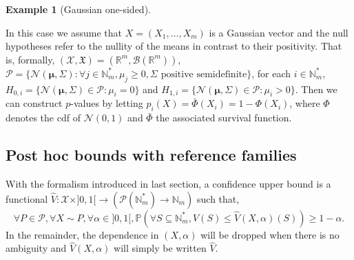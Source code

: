 \documentclass[
  11pt,
  a4paper,
]{article}
\theoremstyle{plain}
\theoremstyle{plain}
\theoremstyle{plain}
\theoremstyle{definition}
\theoremstyle{definition}
\newtheorem{example}{Example}[section]
\theoremstyle{remark}
\begin{document}
\begin{example}[Gaussian
one-sided]\protect\hypertarget{exm-gauss}{}\label{exm-gauss}

In this case we assume that \(X=(X_1,\dotsc,X_m)\) is a Gaussian vector
and the null hypotheses refer to the nullity of the means in contrast to
their positivity. That is, formally,
\((\mathcal{X},\mathfrak{X})=(\mathbb R^m, \mathcal B\left(\mathbb R^m  \right))\),
\(\mathcal P=\{ \mathcal N(\boldsymbol{\mu}, \Sigma) : \forall j \in\mathbb{N}_m^*, \mu_j\geq 0, \Sigma \text{ positive semidefinite}  \}\),
for each \(i\in\mathbb{N}_m^*\),
\(H_{0,i}= \{ \mathcal N(\boldsymbol{\mu}, \Sigma) \in \mathcal P :\mu_i=0 \}\)
and
\(H_{1,i}=\{ \mathcal N(\boldsymbol{\mu}, \Sigma) \in \mathcal P :\mu_i>0 \}\).
Then we can construct \(p\)-values by letting
\(p_i(X)=\bar\Phi(X_i)=1-\Phi(X_i)\), where \(\Phi\) denotes the cdf of
\(\mathcal N(0,1)\) and \(\bar\Phi\) the associated survival function.

\end{example}

\subsection{Post hoc bounds with reference
families}\label{sec-reference-fam}

With the formalism introduced in last section, a confidence upper bound
is a functional
\(\widehat V:\mathcal X\times ]0,1[\to(\mathcal P(\mathbb{N}_m^*) \to \mathbb{N}_m)\)
such that, \begin{equation}
\forall P\in\mathcal P, \forall X\sim P, \forall \alpha \in ]0,1[, \mathbb{P}\left(\forall S \subseteq \mathbb{N}_m^*, V(S)\leq \widehat V(X,\alpha)(S)\right)\geq 1-\alpha.
\label{eq_confidence_formal}
\end{equation} In the remainder, the dependence in \((X,\alpha)\) will
be dropped when there is no ambiguity and \(\widehat V(X,\alpha)\) will
simply be written \(\widehat V\).
\end{document}
